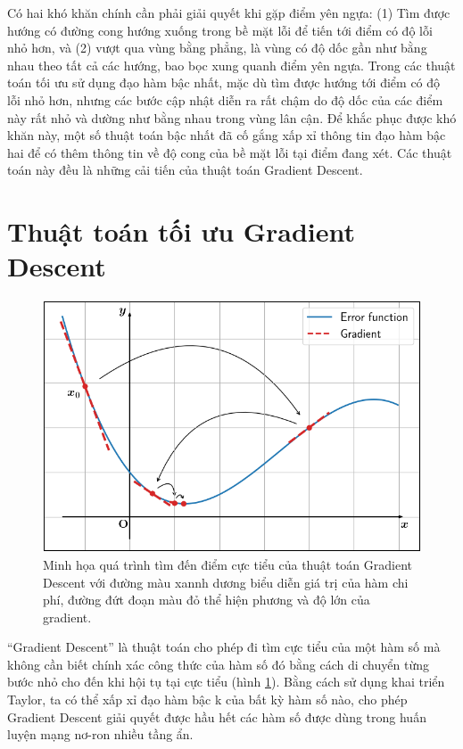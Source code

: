 Có hai khó khăn chính cần phải giải quyết khi gặp điểm yên ngựa: (1) Tìm được hướng có đường cong hướng xuống trong bề mặt lỗi để tiến tới điểm có độ lỗi nhỏ hơn, và (2) vượt qua vùng bằng phẳng, là vùng có độ dốc gần như bằng nhau theo tất cả các hướng, bao bọc xung quanh điểm yên ngựa. Trong các thuật toán tối ưu sử dụng đạo hàm bậc nhất, mặc dù tìm được hướng tới điểm có độ lỗi nhỏ hơn, nhưng các bước cập nhật diễn ra rất chậm do độ dốc của các điểm này rất nhỏ và dường như bằng nhau trong vùng lân cận. Để khắc phục được khó khăn này, một số thuật toán bậc nhất đã cố gắng xấp xỉ thông tin đạo hàm bậc hai để có thêm thông tin về độ cong của bề mặt lỗi tại điểm đang xét. Các thuật toán này đều là những cải tiến của thuật toán Gradient Descent.

\section{Thuật toán tối ưu Gradient Descent}

\begin{figure}[H]
	\centering
	\includegraphics[width=140 mm]{images/gd.png}
	\caption{Minh họa quá trình tìm đến điểm cực tiểu của thuật toán Gradient Descent với đường màu xannh dương biểu diễn giá trị của hàm chi phí, đường đứt đoạn màu đỏ thể hiện phương và độ lớn của gradient.}
	\label{fig:gd}
\end{figure}

``Gradient Descent'' là thuật toán cho phép đi tìm cực tiểu của một hàm số mà không cần biết chính xác công thức của hàm số đó bằng cách di chuyển từng bước nhỏ cho đến khi hội tụ tại cực tiểu (hình \ref{fig:gd}). Bằng cách sử dụng khai triển Taylor, ta có thể xấp xỉ đạo hàm bậc k của bất kỳ hàm số nào, cho phép Gradient Descent giải quyết được hầu hết các hàm số được dùng trong huấn luyện mạng nơ-ron nhiều tầng ẩn.

